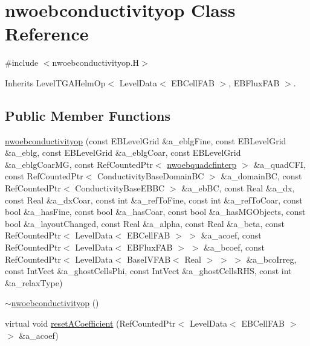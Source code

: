 \hypertarget{classnwoebconductivityop}{}\section{nwoebconductivityop Class Reference}
\label{classnwoebconductivityop}


{\ttfamily \#include $<$nwoebconductivityop.\+H$>$}



Inherits Level\+T\+G\+A\+Helm\+Op$<$ Level\+Data$<$ E\+B\+Cell\+F\+A\+B $>$, E\+B\+Flux\+F\+A\+B $>$.

\subsection*{Public Member Functions}
\begin{DoxyCompactItemize}
\item 
\hyperlink{classnwoebconductivityop_a0ac9814967901258a58ea81883d05db7}{nwoebconductivityop} (const E\+B\+Level\+Grid \&a\+\_\+eblg\+Fine, const E\+B\+Level\+Grid \&a\+\_\+eblg, const E\+B\+Level\+Grid \&a\+\_\+eblg\+Coar, const E\+B\+Level\+Grid \&a\+\_\+eblg\+Coar\+MG, const Ref\+Counted\+Ptr$<$ \hyperlink{classnwoebquadcfinterp}{nwoebquadcfinterp} $>$ \&a\+\_\+quad\+C\+FI, const Ref\+Counted\+Ptr$<$ Conductivity\+Base\+Domain\+BC $>$ \&a\+\_\+domain\+BC, const Ref\+Counted\+Ptr$<$ Conductivity\+Base\+E\+B\+BC $>$ \&a\+\_\+eb\+BC, const Real \&a\+\_\+dx, const Real \&a\+\_\+dx\+Coar, const int \&a\+\_\+ref\+To\+Fine, const int \&a\+\_\+ref\+To\+Coar, const bool \&a\+\_\+has\+Fine, const bool \&a\+\_\+has\+Coar, const bool \&a\+\_\+has\+M\+G\+Objects, const bool \&a\+\_\+layout\+Changed, const Real \&a\+\_\+alpha, const Real \&a\+\_\+beta, const Ref\+Counted\+Ptr$<$ Level\+Data$<$ E\+B\+Cell\+F\+AB $>$ $>$ \&a\+\_\+acoef, const Ref\+Counted\+Ptr$<$ Level\+Data$<$ E\+B\+Flux\+F\+AB $>$ $>$ \&a\+\_\+bcoef, const Ref\+Counted\+Ptr$<$ Level\+Data$<$ Base\+I\+V\+F\+AB$<$ Real $>$ $>$ $>$ \&a\+\_\+bco\+Irreg, const Int\+Vect \&a\+\_\+ghost\+Cells\+Phi, const Int\+Vect \&a\+\_\+ghost\+Cells\+R\+HS, const int \&a\+\_\+relax\+Type)
\item 
\hyperlink{classnwoebconductivityop_af32fc31671dfaf1abc0196927eb945e0}{$\sim$nwoebconductivityop} ()
\item 
virtual void \hyperlink{classnwoebconductivityop_a2e54fe46dfb050ab6262d3a59481e337}{reset\+A\+Coefficient} (Ref\+Counted\+Ptr$<$ Level\+Data$<$ E\+B\+Cell\+F\+AB $>$ $>$ \&a\+\_\+acoef)
\item 

\end{DoxyCompactItemize}
